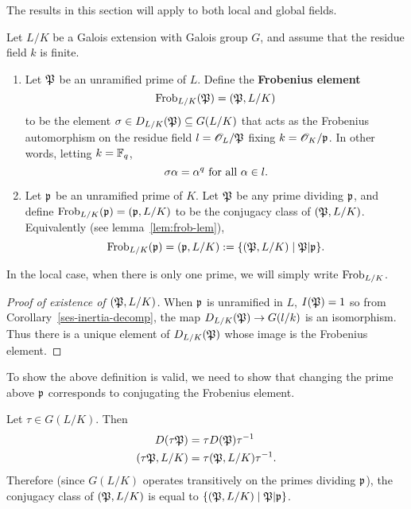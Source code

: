 The results in this section will apply to both local and global fields.
\begin{df}
Let $L/K$ be a Galois extension  with Galois group $G$, and assume that the residue field $k$ is finite. %
\begin{enumerate}
\item Let $\mathfrak{P}$ be an unramified prime of $L$. Define the \textbf{Frobenius element} 
\[\operatorname{Frob}_{L/K}(\mathfrak{P})=(\mathfrak{P},L/K)\]
to be the element $\sigma\in D_{L/K}(\mathfrak{P})\subseteq G(L/K)$ that acts as the Frobenius automorphism on the residue field $l=\mathscr{O}_L/\mathfrak{P}$ fixing $k=\mathscr{O}_K/\mathfrak{p}$. In other words, letting $k=\mathbb{F}_q$,
\[\sigma\alpha =\alpha^q\text{ for all }\alpha\in l.\]
\item Let $\mathfrak{p}$ be an unramified prime of $K$. %
Let $\mathfrak{P}$ be any prime dividing $\mathfrak{p}$, and define $\text{Frob}_{L/K}(\mathfrak{p})=(\mathfrak{p},L/K)$ to be the conjugacy class of $(\mathfrak{P},L/K)$. Equivalently (see lemma~\ref{lem:frob-lem}),
\[
\operatorname{Frob}_{L/K}(\mathfrak{p})=(\mathfrak{p},L/K):=\{(\mathfrak{P},L/K)\mid \mathfrak{P}|\mathfrak{p}\}.
\]
\end{enumerate}
In the local case, when there is only one prime, we will simply write $\operatorname{Frob}_{L/K}$.
\end{df}
\begin{proof}[Proof of existence of $(\mathfrak{P},L/K)$]
When $\mathfrak{p}$ is unramified in $L$, $I(\mathfrak{P})=1$ so from Corollary~\ref{ses-inertia-decomp}, the map $D_{L/K}(\mathfrak{P})\to G(l/k)$ is an isomorphism. Thus there is a unique element of $D_{L/K}(\mathfrak{P})$ whose image is the Frobenius element.
\end{proof}
To show the above definition is valid, we need to show that changing the prime above $\mathfrak{p}$ corresponds to conjugating the Frobenius element.
\begin{lem}
Let $\tau\in G(L/K)$. Then
\begin{align*}
D(\tau \mathfrak{P})&=\tau D(\mathfrak{P})\tau^{-1}\\
(\tau \mathfrak{P},L/K)&=\tau (\mathfrak{P},L/K)\tau^{-1}.
\end{align*}
Therefore (since $G(L/K)$ operates transitively on the primes dividing $\mathfrak{p}$), the conjugacy class of $(\mathfrak{P}, L/K)$ is equal to $\{(\mathfrak{P},L/K)\mid \mathfrak{P}|\mathfrak{p}\}$.
\end{lem}
